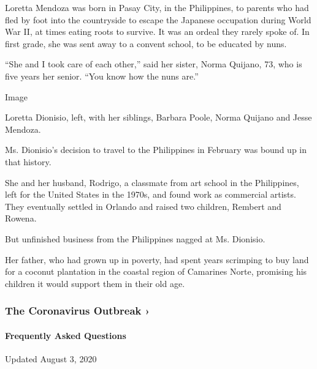 Loretta Mendoza was born in Pasay City, in the Philippines, to parents
who had fled by foot into the countryside to escape the Japanese
occupation during World War II, at times eating roots to survive. It was
an ordeal they rarely spoke of. In first grade, she was sent away to a
convent school, to be educated by nuns.

``She and I took care of each other,'' said her sister, Norma Quijano,
73, who is five years her senior. ``You know how the nuns are.''

Image

Loretta Dionisio, left, with her siblings, Barbara Poole, Norma Quijano
and Jesse Mendoza.

Ms. Dionisio's decision to travel to the Philippines in February was
bound up in that history.

She and her husband, Rodrigo, a classmate from art school in the
Philippines, left for the United States in the 1970s, and found work as
commercial artists. They eventually settled in Orlando and raised two
children, Rembert and Rowena.

But unfinished business from the Philippines nagged at Ms. Dionisio.

Her father, who had grown up in poverty, had spent years scrimping to
buy land for a coconut plantation in the coastal region of Camarines
Norte, promising his children it would support them in their old age.

\href{https://www.nytimes3xbfgragh.onion/news-event/coronavirus?action=click\&pgtype=Article\&state=default\&region=MAIN_CONTENT_3\&context=storylines_faq}{}

\hypertarget{the-coronavirus-outbreak-}{%
\subsubsection{The Coronavirus Outbreak
›}\label{the-coronavirus-outbreak-}}

\hypertarget{frequently-asked-questions}{%
\paragraph{Frequently Asked
Questions}\label{frequently-asked-questions}}

Updated August 3, 2020

